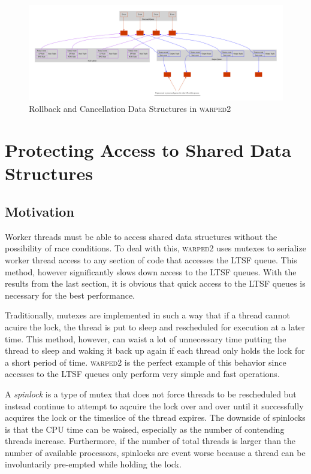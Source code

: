 \documentclass[11pt]{book}
\begin{document}
\begin{figure}[H]
    \centering
    \includegraphics[width=\textwidth]{figs/graphviz/rollback_ds.pdf}
    \caption{Rollback and Cancellation Data Structures in \textsc{warped2}}\label{rollback_ds}
\end{figure}

\section{Protecting Access to Shared Data Structures}

\subsection{Motivation}

Worker threads must be able to access shared data structures without the possibility of
race conditions. To deal with this, \textsc{warped2} uses mutexes to serialize worker thread
access to any section of code that accesses the LTSF queue. This method, however significantly
slows down access to the LTSF queues. With the results from the last section, it is obvious
that quick access to the LTSF queues is necessary for the best performance.

Traditionally, mutexes are implemented in such a way that if a thread cannot acuire the
lock, the thread is put to sleep and rescheduled for execution at a later time. This method,
however, can waist a lot of unnecessary time putting the thread to sleep and waking it
back up again if each thread only holds the lock for a short period of time. \textsc{warped2}
is the perfect example of this behavior since accesses to the LTSF queues only perform
very simple and fast operations.

A \emph{spinlock} is a type of mutex that does not force threads to be rescheduled but
instead continue to attempt to aqcuire the lock over and over until it successfully acquires
the lock or the timeslice of the thread expires. The downside of spinlocks is that the CPU time
can be waised, especially as the number of contending threads increase. Furthermore, if the
number of total threads is larger than the number of available processors, spinlocks are
event worse because a thread can be involuntarily pre-empted while holding the lock.
\end{document}
